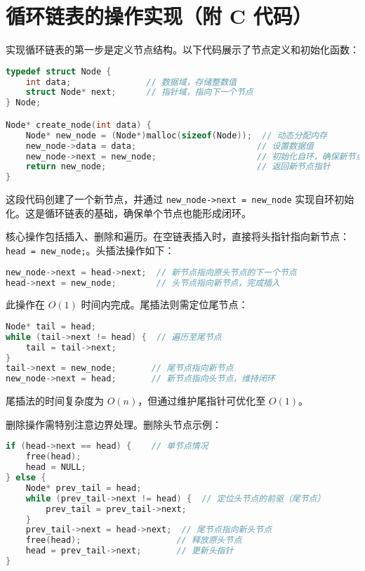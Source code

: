\chapter{循环链表的操作实现（附 C 代码）}
实现循环链表的第一步是定义节点结构。以下代码展示了节点定义和初始化函数：\par
\begin{lstlisting}[language=c]
typedef struct Node {
    int data;               // 数据域，存储整数值
    struct Node* next;      // 指针域，指向下一个节点
} Node;

Node* create_node(int data) {
    Node* new_node = (Node*)malloc(sizeof(Node));  // 动态分配内存
    new_node->data = data;                        // 设置数据值
    new_node->next = new_node;                    // 初始化自环，确保新节点指向自身
    return new_node;                              // 返回新节点指针
}
\end{lstlisting}
这段代码创建了一个新节点，并通过 \texttt{new\_{}node->next = new\_{}node} 实现自环初始化。这是循环链表的基础，确保单个节点也能形成闭环。\par
核心操作包括插入、删除和遍历。在空链表插入时，直接将头指针指向新节点：\texttt{head = new\_{}node;}。头插法操作如下：\par
\begin{lstlisting}[language=c]
new_node->next = head->next;  // 新节点指向原头节点的下一个节点
head->next = new_node;        // 头节点指向新节点，完成插入
\end{lstlisting}
此操作在 $O(1)$ 时间内完成。尾插法则需定位尾节点：\par
\begin{lstlisting}[language=c]
Node* tail = head;
while (tail->next != head) {  // 遍历至尾节点
    tail = tail->next;
}
tail->next = new_node;       // 尾节点指向新节点
new_node->next = head;       // 新节点指向头节点，维持闭环
\end{lstlisting}
尾插法的时间复杂度为 $O(n)$，但通过维护尾指针可优化至 $O(1)$。\par
删除操作需特别注意边界处理。删除头节点示例：\par
\begin{lstlisting}[language=c]
if (head->next == head) {    // 单节点情况
    free(head);
    head = NULL;
} else {
    Node* prev_tail = head;
    while (prev_tail->next != head) {  // 定位头节点的前驱（尾节点）
        prev_tail = prev_tail->next;
    }
    prev_tail->next = head->next;  // 尾节点指向新头节点
    free(head);                   // 释放原头节点
    head = prev_tail->next;       // 更新头指针
}
\end{lstlisting}
